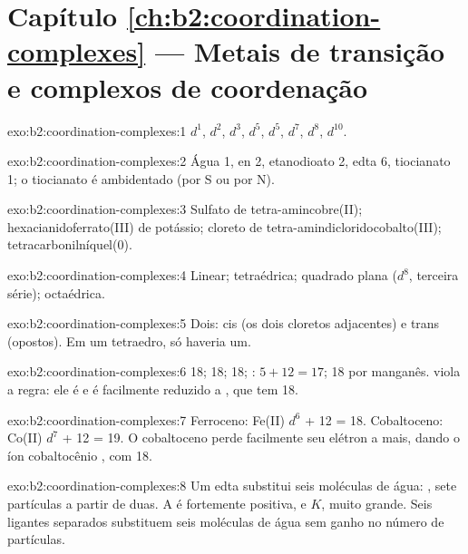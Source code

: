 \section*{Capítulo \ref{ch:b2:coordination-complexes} --- Metais de transição e complexos de coordenação}

\begin{solution}{exo:b2:coordination-complexes:1}
 $d^1$,  $d^2$,  $d^3$,  $d^5$,  $d^5$, 
$d^7$,  $d^8$,  $d^{10}$.
\end{solution}

\begin{solution}{exo:b2:coordination-complexes:2}
Água 1, en 2, etanodioato 2, edta 6, tiocianato 1; o tiocianato é ambidentado
(por S ou por N).
\end{solution}

\begin{solution}{exo:b2:coordination-complexes:3}
Sulfato de tetra-amin\-cobre(II); hexaciani\-doferrato(III) de potássio;
cloreto de tetra-amin\-diclorido\-cobalto(III); tetracarbonil\-níquel(0).
\end{solution}

\begin{solution}{exo:b2:coordination-complexes:4}
Linear; tetraédrica; quadrado plana ($d^8$, terceira série); octaédrica.
\end{solution}

\begin{solution}{exo:b2:coordination-complexes:5}
Dois: cis (os dois cloretos adjacentes) e trans (opostos). Em um tetraedro, só
haveria um.
\end{solution}

\begin{solution}{exo:b2:coordination-complexes:6}
 18;  18;  18; : $5 + 12 = 17$;
 18 por manganês.  viola a regra: ele é  e
é facilmente reduzido a \ce{[V(CO)6]-}, que tem 18.
\end{solution}

\begin{solution}{exo:b2:coordination-complexes:7}
Ferroceno: Fe(II) $d^6$ + 12 = 18. Cobaltoceno: Co(II) $d^7$ + 12 = 19. O
cobaltoceno perde facilmente seu elétron a mais, dando o íon cobaltocênio
\ce{[Co(C5H5)2]+}, com 18.
\end{solution}

\begin{solution}{exo:b2:coordination-complexes:8}
Um edta substitui seis moléculas de água: , sete partículas a partir de duas. A  é fortemente
positiva, e $K$, muito grande. Seis ligantes separados substituem seis
moléculas de água sem ganho no número de partículas.
\end{solution}

